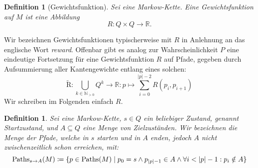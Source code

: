 \documentclass[a4paper]{article}
\newcommand{\mc}{Markow-Kette}
\newtheorem{definition}[satz]{Definition} %
\theoremstyle{nonumberplain}
\begin{document}
	\newcommand{\reward}{Gewichtsfunktion}
	\begin{definition}[\reward]
		Sei \mcex{} eine \mc{}. Eine \reward{} auf $M$ ist eine Abbildung
		\begin{equation}
		R : Q \times Q \to \mathbb{R}\text{.}
		\end{equation} 
	\end{definition}
	Wir bezeichnen Gewichtsfunktionen typischerweise mit $R$ in Anlehnung an das englische Wort \textit{reward}.
	Offenbar gibt es analog zur Wahrscheinlichkeit $P$ eine eindeutige Fortsetzung für eine \reward{} $R$ auf Pfade, gegeben durch Aufsummierung aller Kantengewichte entlang eines solchen:
	\begin{equation}
	\mathrm{\tilde{R}} : \bigcup_{k \in \mathbb{N}_{>0}}{Q^k} \to \mathbb{R} : p \mapsto \sum_{i = 0}^{|p| - 2}{R(p_i,p_{i+1})}
	\end{equation}
	Wir schreiben im Folgenden einfach $R$.
	\begin{definition}\label{def-path-to}
		Sei \mcex{} eine \mc{}, $s \in Q$ ein beliebiger Zustand, genannt Startzustand, und $A \subseteq Q$ eine Menge von Zielzuständen. Wir bezeichnen die Menge der Pfade, welche in $s$ starten und in $A$ enden, jedoch $A$ nicht zwischenzeitlich schon erreichen, mit:
		\begin{equation}
		\mathrm{Paths}_{s \rightarrow A}(M) \coloneqq \{ p \in \mathrm{Paths}(M) \mid p_0 = s \land p_{|p|-1} \in A \land \forall i < |p| - 1 : p_i \notin A \}
		\end{equation}
		
	\end{definition}
	
\end{document}
